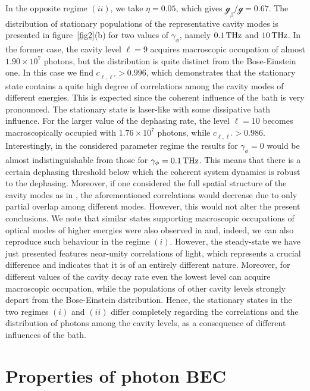 \documentclass[12pt, a4paper]{iopart}
\begin{document}
In the opposite regime $(ii)$, we take $\eta=0.05$, which gives $\mathcal{g}_\beta/\mathcal{g}=0.67$. The distribution of stationary populations of the representative cavity modes is presented in figure~\ref{fig2}(b) {for two values of $\gamma_\phi$, namely $0.1\,{\rm THz}$ and $10\,{\rm THz}$.} In the former case, the cavity level $\ell=9$ acquires macroscopic occupation of almost $1.90\times 10^7$ photons, but the distribution is quite distinct from the Bose-Einstein one. In this case we find $c_{\ell,\ell'}^{} >0.996$, which demonstrates that the stationary state contains a quite high degree of correlations among the cavity modes of different energies. This is expected since the coherent influence of the bath is very pronounced. The stationary state is laser-like with some dissipative bath influence. {For the larger value of the dephasing rate, the level $\ell=10$ becomes macroscopically occupied with $1.76\times 10^7$ photons, while $c_{\ell,\ell'}^{}>0.986$. Interestingly, in the considered parameter regime the results for $\gamma_\phi=0$ would be almost indistinguishable from those for $\gamma_\phi=0.1\,{\rm THz}$. This means that there is a certain dephasing threshold below which the coherent system dynamics is robust to the dephasing. Moreover, if one considered the full spatial structure of the cavity modes as in \cite{Keeling-Spatial_dynamics}, the aforementioned correlations would decrease due to only partial overlap among different modes. However, this would not alter the present conclusions.} We note that similar states supporting macroscopic occupations of optical modes of higher energies were also observed in \cite{Keeling_PRL-nonequilibrium_model_photon-cond,Keeling-Thermalization_photon_condensate} and, indeed, we can also reproduce such behaviour in the regime $(i)$. However, the steady-state we have just presented features near-unity correlations of light, which represents a crucial difference and indicates that it is of an entirely different nature. Moreover, for different values of the cavity decay rate even the lowest level can acquire macroscopic occupation, while the populations of other cavity levels strongly depart from the Bose-Einstein distribution. Hence, the stationary states in the two regimes $(i)$ and $(ii)$ differ completely regarding the correlations and the distribution of photons among the cavity levels, as a consequence of different influences of the bath.

\section{Properties of photon BEC}\label{sec:interaction}
\end{document}
